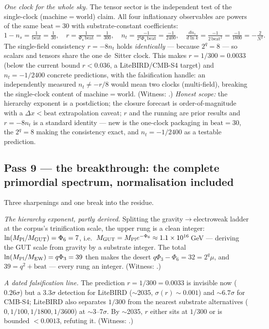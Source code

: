 \documentclass[11pt]{article}
\begin{document}
\emph{One clock for the whole sky.} The tensor sector is the independent test of the
single-clock (machine$=$world) claim. All four inflationary observables are powers of the
same $\mathrm{beat}=30$ with substrate-constant coefficients:
\[
1-n_s=\tfrac1{\mathrm{beat}}=\tfrac1{30},\quad r=\tfrac1{\Phi_4\,\mathrm{beat}}=\tfrac1{300},
\quad n_t=\tfrac{-1}{2^q\Phi_4\,\mathrm{beat}}=\tfrac{-1}{2400},\quad
\tfrac{dn_s}{d\ln k}=\tfrac{-1}{2\,\mathrm{beat}^2}=\tfrac{-1}{1800}=-\tfrac2{N^2}.
\]
The single-field consistency $r=-8n_t$ holds \emph{identically} --- because $2^q=8$ --- so
scalars and tensors share the one de~Sitter clock. This makes $r=1/300=0.0033$ (below the
current bound $r<0.036$, a LiteBIRD/CMB-S4 target) and $n_t=-1/2400$ concrete predictions,
with the falsification handle: an independently measured $n_t\ne-r/8$ would mean two
clocks (multi-field), breaking the single-clock content of machine$=$world. (Witness:
.) \emph{Honest scope:} the hierarchy exponent is a
postdiction; the closure forecast is order-of-magnitude with a $\Delta x<\mathrm{beat}$
extrapolation caveat; $r$ and the running are prior results and $r=-8n_t$ is a standard
identity --- new is the one-clock packaging in $\mathrm{beat}=30$, the $2^q=8$ making the
consistency exact, and $n_t=-1/2400$ as a testable prediction.

\subsection{Pass 9 --- the breakthrough: the complete primordial spectrum, normalisation included}
\label{sec:capstone-nine}

Three sharpenings and one break into the residue.

\emph{The hierarchy exponent, partly derived.} Splitting the gravity$\to$electroweak
ladder at the corpus's trinification scale, the upper rung is a clean integer:
$\ln(M_{\rm Pl}/M_{\rm GUT})=\Phi_6=7$, i.e.\ $M_{\rm GUT}=M_{\rm Pl}e^{-\Phi_6}\approx
1.1\times10^{16}$\,GeV --- deriving the GUT scale from gravity by a substrate integer. The
total $\ln(M_{\rm Pl}/M_{\rm EW})=q\Phi_3=39$ then makes the desert $q\Phi_3-\Phi_6=32=
2^q\mu$, and $39=q^2+\mathrm{beat}$ --- every rung an integer. (Witness:
.)

\emph{A dated falsification line.} The prediction $r=1/300=0.0033$ is invisible now
($0.26\sigma$) but a $3.3\sigma$ detection for LiteBIRD ($\sim$2035, $\sigma(r)\sim0.001$)
and $\sim$$6.7\sigma$ for CMB-S4; LiteBIRD also separates $1/300$ from the nearest
substrate alternatives ($0,1/100,1/1800,1/3600$) at $\sim$3--7$\sigma$. By $\sim$2035, $r$
either sits at $1/300$ or is bounded $<0.0013$, refuting it. (Witness:
.)
\end{document}
